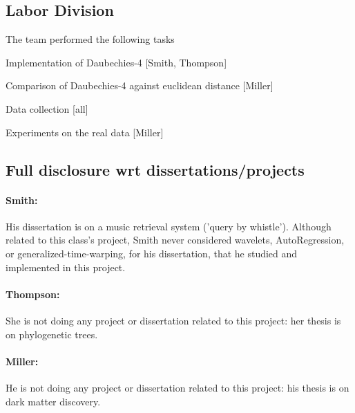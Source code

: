 
\subsection{Labor Division}

The team performed the following tasks
\bit
\item Implementation of Daubechies-4 [Smith, Thompson]
\item Comparison of Daubechies-4 against euclidean distance [Miller]
\item Data collection [all]
\item Experiments on the real data [Miller]
\eit

\subsection{Full disclosure wrt dissertations/projects}

\paragraph{Smith:}
His dissertation  is on a music retrieval system ('query by whistle').
Although related to this class's project,
Smith never considered wavelets, AutoRegression, or generalized-time-warping,
for his dissertation, that he studied and implemented in this project.

\paragraph{Thompson:}
She is not doing any project or dissertation
related to this project: her thesis is on phylogenetic trees.

\paragraph{Miller:} He is not doing any project or dissertation
related to this project: his thesis is on dark matter discovery.

